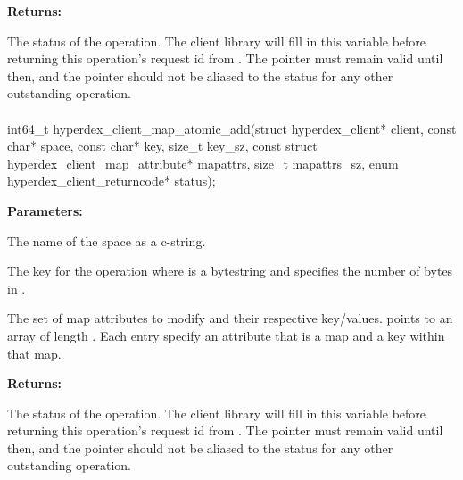 \noindent\textbf{Returns:}
\begin{description}[labelindent=\widthof{{\code{status}}},leftmargin=*,noitemsep,nolistsep,align=right]
\item[\code{status}] The status of the operation.  The client library will fill in this variable before returning this operation's request id from .  The pointer must remain valid until then, and the pointer should not be aliased to the status for any other outstanding operation.
\end{description}

\paragraph{}
\label{api:c:map_atomic_add}
\begin{ccode}
int64_t hyperdex_client_map_atomic_add(struct hyperdex_client* client,
                const char* space,
                const char* key, size_t key_sz,
                const struct hyperdex_client_map_attribute* mapattrs, size_t mapattrs_sz,
                enum hyperdex_client_returncode* status);
\end{ccode}
\funcdesc 

\noindent\textbf{Parameters:}
\begin{description}[labelindent=\widthof{{\code{mapattrs}, \code{mapattrs\_sz}}},leftmargin=*,noitemsep,nolistsep,align=right]
\item[\code{space}] The name of the space as a c-string.
\item[\code{key}, \code{key\_sz}] The key for the operation where  is a bytestring and  specifies the number of bytes in .
\item[\code{mapattrs}, \code{mapattrs\_sz}] The set of map attributes to modify and their respective key/values.   points to an array of length .  Each entry specify an attribute that is a map and a key within that map.
\end{description}

\noindent\textbf{Returns:}
\begin{description}[labelindent=\widthof{{\code{status}}},leftmargin=*,noitemsep,nolistsep,align=right]
\item[\code{status}] The status of the operation.  The client library will fill in this variable before returning this operation's request id from .  The pointer must remain valid until then, and the pointer should not be aliased to the status for any other outstanding operation.
\end{description}

